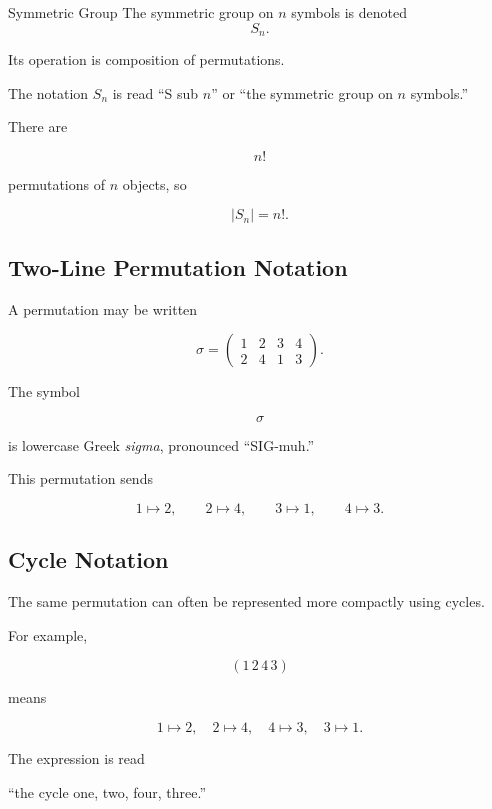 \begin{definitionbox}{Symmetric Group}
The symmetric group on \(n\) symbols is denoted
\[ S_n. \]

Its operation is composition of permutations.
\end{definitionbox}

The notation \(S_n\) is read ``S sub \(n\)'' or ``the symmetric group on
\(n\) symbols.''

There are

\[ n! \]

permutations of \(n\) objects, so

\[ |S_n|=n!. \]

\subsection{Two-Line Permutation Notation}
\label{subsec:two-line-permutations}

A permutation may be written

\[
\sigma=
\begin{pmatrix}
1&2&3&4\\
2&4&1&3
\end{pmatrix}.
\]

The symbol

\[ \sigma \]

is lowercase Greek \emph{sigma}, pronounced ``SIG-muh.''

This permutation sends

\[ 1\mapsto2,\qquad2\mapsto4,\qquad3\mapsto1,\qquad4\mapsto3. \]

\subsection{Cycle Notation}
\label{subsec:cycle-notation}

The same permutation can often be represented more compactly using cycles.

For example,

\[ (1\,2\,4\,3) \]

means

\[ 1\mapsto2,\quad2\mapsto4,\quad4\mapsto3,\quad3\mapsto1. \]

The expression is read

\begin{center}
``the cycle one, two, four, three.''
\end{center}

